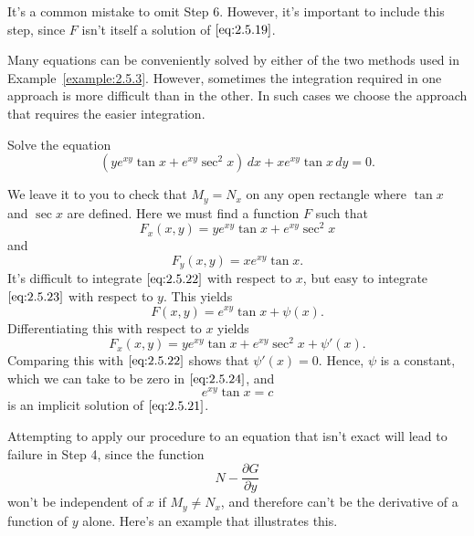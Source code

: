 \documentclass{ximera}
\begin{document}
 
 
It's a common mistake to omit Step 6. However, it's important to
include this step, since $F$ isn't  itself a solution of
$\eqref{eq:2.5.19}$.
 
Many equations can be conveniently solved by either of the two methods
used in Example~\ref{example:2.5.3}. However, sometimes the integration
required in one approach is  more difficult than in the
other. In such cases we choose the approach that requires the easier integration.
 
\begin{example}\label{example:2.5.4}
 Solve the equation
\begin{equation}  \label{eq:2.5.21}
(ye^{xy} \tan x+e^{xy} \sec^2x)\,dx+xe^{xy} \tan x\,dy=0.
\end{equation}
 
 
\begin{explanation} We leave it to you to check that
$M_y=N_x$ on any open rectangle  where $\tan x$ and $\sec x$ are
defined. Here we must find a function $F$ such that
\begin{equation} \label{eq:2.5.22}
F_x(x,y)=ye^{xy} \tan x+e^{xy} \sec^2 x
\end{equation}
 and
\begin{equation}  \label{eq:2.5.23}
F_y(x,y)=xe^{xy} \tan x.
\end{equation}
 It's difficult to integrate $\eqref{eq:2.5.22}$ with respect to $x$, but
easy to integrate $\eqref{eq:2.5.23}$ with respect to $y$.  This yields
\begin{equation} \label{eq:2.5.24}
F(x,y)=e^{xy} \tan x+\psi (x).
\end{equation}
Differentiating this with respect to $x$ yields
$$
F_x(x,y)=ye^{xy}\tan x+e^{xy}\sec^2x+\psi'(x).
$$
 Comparing this with $\eqref{eq:2.5.22}$ shows that  $\psi'(x)=0$.
Hence, $\psi$ is  a constant, which we can take to be zero in
$\eqref{eq:2.5.24}$, and
$$
e^{xy} \tan x=c
$$
is an implicit solution of $\eqref{eq:2.5.21}$.
\end{explanation}
\end{example}
 
Attempting to apply our procedure to an equation that isn't  exact
will lead to failure in  Step 4, since the function
$$
 N-\frac{\partial G}{\partial y}
$$
won't be independent of $x$ if $M_y\neq N_x$,
and therefore
can't be the derivative of a function of $y$ alone. Here's an example that
illustrates this.
 
\end{document}
